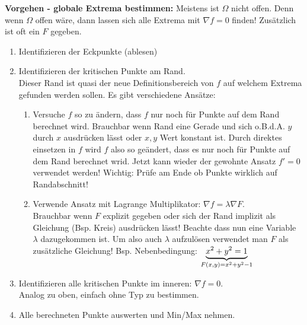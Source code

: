 \textbf{Vorgehen - globale Extrema bestimmen:} 
Meistens ist $\Omega$ nicht offen. Denn wenn $\Omega$ offen wäre, dann lassen sich alle Extrema mit $\nabla f = 0$ finden! Zusätzlich ist oft ein $F$ gegeben.
\begin{enumerate}[leftmargin=0.5cm]
	\item Identifizieren der Eckpunkte (ablesen)

	\item Identifizieren der kritischen Punkte am Rand. \\
	Dieser Rand ist quasi der neue Definitionsbereich von $f$ auf welchem Extrema gefunden werden sollen. Es gibt verschiedene Ansätze:
	\begin{enumerate}[leftmargin=0.3cm]
		\item Versuche $f$ so zu ändern, dass $f$ nur noch für Punkte auf dem Rand berechnet wird. Brauchbar wenn Rand eine Gerade und sich o.B.d.A. $y$ durch $x$ ausdrücken lässt oder $x, y$ Wert konstant ist. Durch direktes einsetzen in $f$ wird $f$ also so geändert, dass es nur noch für Punkte auf dem Rand berechnet wrid. Jetzt kann wieder der gewohnte Ansatz $f' = 0$ verwendet werden! Wichtig: Prüfe am Ende ob Punkte wirklich auf Randabschnitt!

		\item Verwende Ansatz mit Lagrange Multiplikator: $\nabla f = \lambda \nabla F$.\\
		Brauchbar wenn $F$ explizit gegeben oder sich der Rand implizit als Gleichung (Bsp. Kreis) ausdrücken lässt! Beachte dass nun eine Variable $\lambda$ dazugekommen ist. Um also auch $\lambda$ aufzulösen verwendet man $F$ als zusätzliche Gleichung! 
		Bsp. Nebenbedingung: $\underset{F(x,y) = x^2 + y^2 - 1}{\underbrace{x^2 + y^2 = 1}}$
 	\end{enumerate}

 	\item Identifizieren alle kritischen Punkte im inneren: $\nabla f = 0$. \\
	Analog zu oben, einfach ohne Typ zu bestimmen.

	\item Alle berechneten Punkte auswerten und Min/Max nehmen.
\end{enumerate}

